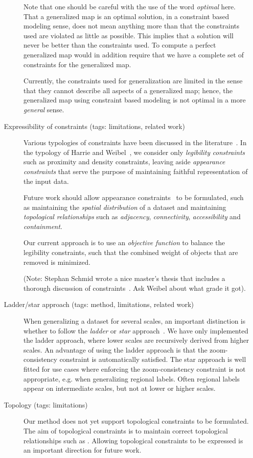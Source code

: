 \documentclass[11pt, oneside]{article}   	%
\begin{document}
\begin{description}
Note that one should be careful with the use of the word \emph{optimal} here. That a generalized map is an optimal solution, in a constraint based modeling sense, does not mean anything more than that the constraints used are violated as little as possible. This implies that a solution will never be better than the constraints used. To compute a perfect generalized map would in addition require that we have a complete set of constraints for the generalized map. 

Currently, the constraints used for generalization are limited in the sense that they cannot describe all aspects of a generalized map; hence, the generalized map using constraint based modeling is not optimal in a more \emph{general} sense.

\item[Expressibility of constraints (tags: limitations, related work)] Various typologies of constraints have been discussed in the literature~\cite{beard1991constraints,harrie2007modelling}. In the typology of Harrie and Weibel~\cite{harrie2007modelling}, we consider only \emph{legibility constraints} such as proximity and density constraints, leaving aside \emph{appearance constraints} that serve the purpose of maintaining faithful representation of the input data. 

Future work should allow appearance constraints~\cite{harrie2007modelling} to be formulated, such as maintaining the \emph{spatial distribution} of a dataset and maintaining \emph{topological relationships} such as \emph{adjacency}, \emph{connectivity}, \emph{accessibility} and \emph{containment}.

Our current approach is to use an \emph{objective function} to balance the legibility constraints, such that the combined weight of objects that are removed is minimized. 

(Note: Stephan Schmid wrote a nice master's thesis that includes a thorough discussion of constraints~\cite{schmid2008automated}. Ask Weibel about what grade it got).

\item[Ladder/star approach (tags: method, limitations, related work)] When generalizing a dataset for several scales, an important distinction is whether to follow the \emph{ladder} or \emph{star} approach~\cite{foerster2010challenges}. We have only implemented the ladder approach, where lower scales are recursively derived from higher scales. An advantage of using the ladder approach is that the zoom-consistency constraint is automatically satisfied. The star approach is well fitted for use cases where enforcing the zoom-consistency constraint is not appropriate, e.g. when generalizing regional labels. Often regional labels appear on intermediate scales, but not at lower or higher scales.

\item[Topology (tags: limitations)] Our method does not yet support topological constraints to be formulated. The aim of topological constraints is to maintain correct topological relationships such as . Allowing topological constraints to be expressed is an important direction for future work.

\end{description}
\end{document}
